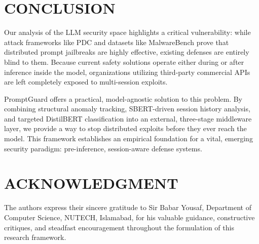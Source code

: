 \documentclass[conference]{IEEEtran}
\begin{document}
\section{CONCLUSION}

Our analysis of the LLM security space highlights a critical vulnerability: while attack frameworks like PDC and datasets like MalwareBench prove that distributed prompt jailbreaks are highly effective, existing defenses are entirely blind to them. Because current safety solutions operate either during or after inference inside the model, organizations utilizing third-party commercial APIs are left completely exposed to multi-session exploits.

PromptGuard offers a practical, model-agnostic solution to this problem. By combining structural anomaly tracking, SBERT-driven session history analysis, and targeted DistilBERT classification into an external, three-stage middleware layer, we provide a way to stop distributed exploits before they ever reach the model. This framework establishes an empirical foundation for a vital, emerging security paradigm: pre-inference, session-aware defense systems.

\section*{ACKNOWLEDGMENT}

The authors express their sincere gratitude to Sir Babar Yousaf, Department of Computer Science, NUTECH, Islamabad, for his valuable guidance, constructive critiques, and steadfast encouragement throughout the formulation of this research framework.
\end{document}
